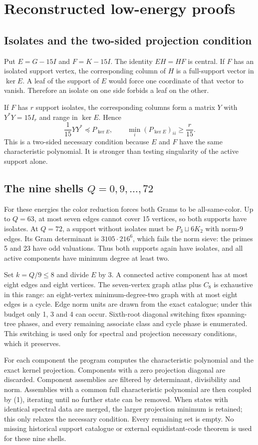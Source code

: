 \documentclass[11pt,a4paper]{article}
\begin{document}
\section{Reconstructed low-energy proofs}
\subsection{Isolates and the two-sided projection condition}
Put $E=G-15I$ and $F=K-15I$. The identity $EH=HF$ is central. If $F$ has an isolated support vertex, the corresponding column of $H$ is a full-support vector in $\ker E$. A leaf of the support of $E$ would force one coordinate of that vector to vanish. Therefore an isolate on one side forbids a leaf on the other.

If $F$ has $r$ support isolates, the corresponding columns form a matrix $Y$ with $Y^*Y=15I_r$ and range in $\ker E$. Hence
\[
 \frac1{15}YY^*\preceq P_{\ker E},\qquad
 \min_i(P_{\ker E})_{ii}\ge\frac r{15}.                 \tag{1}
\]
This is a two-sided necessary condition because $E$ and $F$ have the same characteristic polynomial. It is stronger than testing singularity of the active support alone.

\subsection{The nine shells $Q=0,9,\ldots,72$}
For these energies the color reduction forces both Grams to be all-same-color. Up to $Q=63$, at most seven edges cannot cover 15 vertices, so both supports have isolates. At $Q=72$, a support without isolates must be $P_3\sqcup6K_2$ with norm-9 edges. Its Gram determinant is $3105\cdot216^6$, which fails the norm sieve: the primes 5 and 23 have odd valuations. Thus both supports again have isolates, and all active components have minimum degree at least two.

Set $k=Q/9\le8$ and divide $E$ by 3. A connected active component has at most eight edges and eight vertices. The seven-vertex graph atlas plus $C_8$ is exhaustive in this range: an eight-vertex minimum-degree-two graph with at most eight edges is a cycle. Edge norm units are drawn from the exact catalogue; under this budget only 1, 3 and 4 can occur. Sixth-root diagonal switching fixes spanning-tree phases, and every remaining associate class and cycle phase is enumerated. This switching is used only for spectral and projection necessary conditions, which it preserves.

For each component the program computes the characteristic polynomial and the exact kernel projection. Components with a zero projection diagonal are discarded. Component assemblies are filtered by determinant, divisibility and norm. Assemblies with a common full characteristic polynomial are then coupled by (1), iterating until no further state can be removed. When states with identical spectral data are merged, the larger projection minimum is retained; this only relaxes the necessary condition. Every remaining set is empty. No missing historical support catalogue or external equidistant-code theorem is used for these nine shells.
\end{document}
